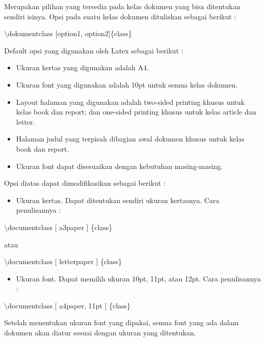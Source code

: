 Merupakan pilihan yang tersedia pada kelas dokumen yang bisa ditentukan sendiri isinya. Opsi pada suatu kelas dokumen dituliskan sebagai berikut :\par \vspace{12pt}

$\setminus$dokumentclass $[$option1, option2$]$\{class\}
\par \vspace{12pt}


Default opsi yang digunakan oleh Latex sebagai berikut :

\begin{itemize}
\item Ukuran kertas yang digunakan adalah A4.
\item Ukuran font yang digunakan adalah 10pt untuk semua kelas dokumen.
\item Layout halaman yang digunakan adalah two-sided printing khusus untuk kelas book dan report; dan one-sided printing khusus untuk kelas article dan letter.
\item Halaman judul yang terpisah dibagian awal dokumen khusus untuk kelas book dan report.
\item  Ukuran font dapat disesuaikan dengan kebutuhan masing-masing.
\end{itemize}
Opsi diatas dapat dimodifikasikan sebagai berikut :

\begin{itemize}
\item Ukuran kertas. Dapat ditentukan sendiri ukuran kertasnya. Cara 
penulisannya :
\end{itemize}
\hspace{0,5in}$\setminus$documentclass $[$ a3paper $]$ \{class\}

\hspace{0,5in}atau

\hspace{0,5in}$\setminus$documentclass $[$ letterpaper $]$ \{class\}

\begin{itemize}
\item Ukuran font. Dapat memilih ukuran 10pt, 11pt, atau 12pt. Cara penulisannya :
\end{itemize}
\hspace{0,5in}$\setminus$documentclass $[$ a4paper, 11pt $]$ \{class\}\par \vspace{12pt}

Setelah menentukan ukuran font yang dipakai, semua font yang ada dalam dokumen akan diatur sesuai dengan ukuran yang ditentukan.\par \vspace{12pt}

